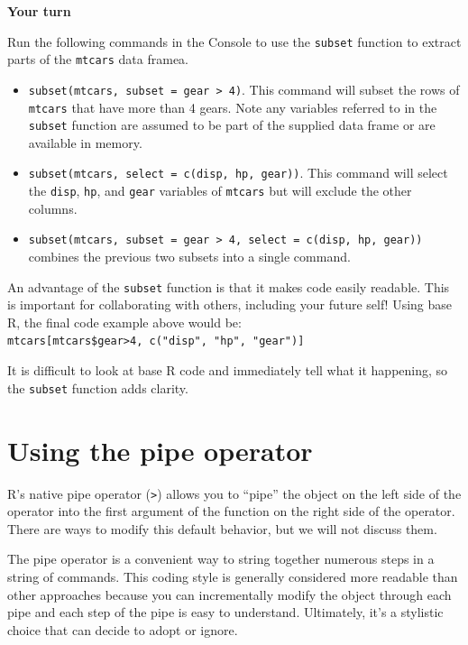 \documentclass[
]{book}
\providecommand{\tightlist}{%
  \setlength{\itemsep}{0pt}\setlength{\parskip}{0pt}}
\theoremstyle{definition}
\theoremstyle{definition}
\theoremstyle{definition}
\theoremstyle{definition}
\theoremstyle{remark}
\begin{document}
\begin{yourturn}

\textbf{Your turn}

Run the following commands in the Console to use the \texttt{subset} function to extract parts of the \texttt{mtcars} data framea.

\begin{itemize}
\tightlist
\item
  \texttt{subset(mtcars,\ subset\ =\ gear\ \textgreater{}\ 4)}. This command will subset the rows of \texttt{mtcars} that have more than 4 gears. Note any variables referred to in the \texttt{subset} function are assumed to be part of the supplied data frame or are available in memory.
\item
  \texttt{subset(mtcars,\ select\ =\ c(disp,\ hp,\ gear))}. This command will select the \texttt{disp}, \texttt{hp}, and \texttt{gear} variables of \texttt{mtcars} but will exclude the other columns.
\item
  \texttt{subset(mtcars,\ subset\ =\ gear\ \textgreater{}\ 4,\ select\ =\ c(disp,\ hp,\ gear))} combines the previous two subsets into a single command.
\end{itemize}

\end{yourturn}

An advantage of the \texttt{subset} function is that it makes code easily readable. This is important for collaborating with others, including your future self! Using base R, the final code example above would be: \texttt{mtcars{[}mtcars\$gear\textgreater{}4,\ c("disp",\ "hp",\ "gear"){]}}

It is difficult to look at base R code and immediately tell what it happening, so the \texttt{subset} function adds clarity.

\hypertarget{using-the-pipe-operator}{%
\section{Using the pipe operator}\label{using-the-pipe-operator}}

R's native pipe operator (\texttt{\textbar{}\textgreater{}}) allows you to ``pipe'' the object on the left side of the operator into the first argument of the function on the right side of the operator. There are ways to modify this default behavior, but we will not discuss them.

The pipe operator is a convenient way to string together numerous steps in a string of commands. This coding style is generally considered more readable than other approaches because you can incrementally modify the object through each pipe and each step of the pipe is easy to understand. Ultimately, it's a stylistic choice that can decide to adopt or ignore.
\end{document}
